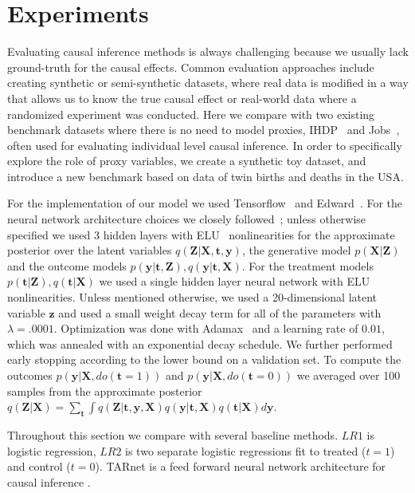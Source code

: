 \documentclass{article}
\def\*#1{\mathbf{#1}}
\begin{document}
\section{Experiments}
Evaluating causal inference methods is always challenging because we usually lack ground-truth for the causal effects. Common evaluation approaches include creating synthetic or semi-synthetic datasets, where real data is modified in a way that allows us to know the true causal effect or real-world data where a randomized experiment was conducted. Here we compare with two existing benchmark datasets where there is no need to model proxies, IHDP~\citep{hill2011bayesian} and Jobs~\citep{lalonde1986evaluating}, often used for evaluating individual level causal inference. In order to specifically explore the role of proxy variables, we create a synthetic toy dataset, and introduce a new benchmark based on data of twin births and deaths in the USA.

For the implementation of our model we used Tensorflow~\citep{abadi2016tensorflow} and Edward~\citep{tran2016edward}. For the neural network architecture choices we closely followed~\cite{shalit2016estimating}; unless otherwise specified we used 3 hidden layers with ELU~\citep{clevert2015fast} nonlinearities for the approximate posterior over the latent variables $q(\*Z|\*X, \*t, \*y)$, the generative model $p(\*X|\*Z)$ and the outcome models $p(\*y|\*t,\*Z), q(\*y|\*t,\*X)$. For the treatment models $p(\*t|\*Z),q(\*t|\*X)$ we used a single hidden layer neural network with ELU nonlinearities. Unless mentioned otherwise, we used a 20-dimensional latent variable $\*z$ and used a small weight decay term for all of the parameters with $\lambda = .0001$. Optimization was done with Adamax~\citep{kingma2014adam} and a learning rate of $0.01$, which was annealed with an exponential decay schedule. We further performed early stopping according to the lower bound on a validation set. To compute the outcomes $p(\*y|\*X, do(\*t=1))$ and $p(\*y|\*X, do(\*t=0))$ we averaged over 100 samples from the approximate posterior $q(\*Z|\*X) = \sum_{\*t} \int q(\*Z|\*t,\*y,\*X)q(\*y|\*t,\*X)q(\*t|\*X) d\*y$.

Throughout this section we compare with several baseline methods. $LR1$ is logistic regression, $LR2$ is two separate logistic regressions fit to treated ($t=1$) and control ($t=0$). TARnet is a feed forward neural network architecture for causal inference \citep{shalit2016estimating}. 
\end{document}

